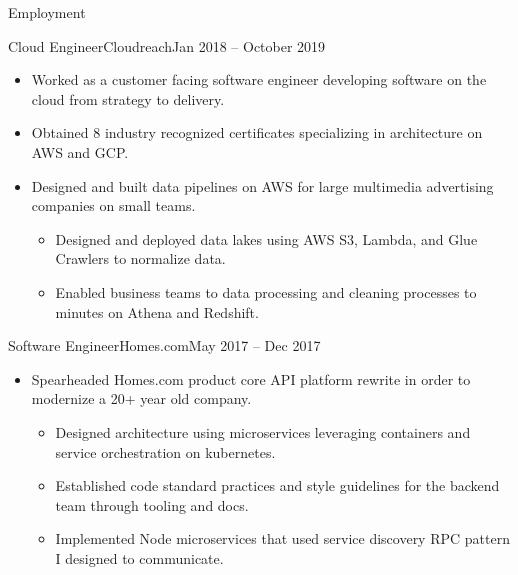 \documentclass[]{mcdowellcv}
\begin{document}
\begin{cvsection}{Employment}
        \begin{cvsubsection}{Cloud Engineer}{Cloudreach}{Jan 2018 – October 2019}
            \begin{itemize}
                \item Worked as a customer facing software engineer developing software on the cloud from strategy to delivery. 
                \item Obtained 8 industry recognized certificates specializing in architecture on AWS and GCP.
                \end{itemize}
                \begin{itemize}
                    \item Designed and built data pipelines on AWS for large multimedia advertising companies on small teams.
                    \begin{itemize}
                        \item Designed and deployed data lakes using AWS S3, Lambda, and Glue Crawlers to normalize data.
                        \item Enabled business teams to data processing and cleaning processes to minutes on Athena and Redshift.
                    \end{itemize}
                \end{itemize}
        \end{cvsubsection}

        \begin{cvsubsection}{Software Engineer}{Homes.com}{May 2017 – Dec 2017}
            \begin{itemize}
                \item Spearheaded Homes.com product core API platform rewrite in order to modernize a 20+ year old company.
                \begin{itemize}
                    \item Designed architecture using microservices leveraging containers and service orchestration on kubernetes. 
                    \item Established code standard practices and style guidelines for the backend team through tooling and docs.
                    \item Implemented Node microservices that used service discovery RPC pattern I designed to communicate.
                    
                \end{itemize}
            \end{itemize}
        \end{cvsubsection}


\end{cvsection}
\end{document}
